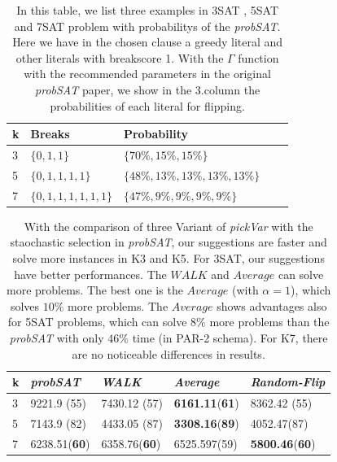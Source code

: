\documentclass[12pt,a4paper,twoside]{scrartcl}
\numberwithin{equation}{section}
\begin{document}
\begin{table}[h!]
\label{parma}
\begin{center}
\begin{tabular}{|l|l|l|l|p{3cm}|}\hline 
k&  Breaks &          Probability  \\ \hline     
3&  $\{0, 1, 1\}$ & $\{70\%, 15\%, 15\%\}$   \\ \hline         
5 &  $\{0, 1, 1, 1, 1\}$   & $\{  48\%, 13\%, 13\%, 13\%, 13\%\}$\\ \hline
7 & $\{0, 1, 1, 1, 1, 1, 1\}$&    $\{  47\%, 9\%, 9\%, 9\%, 9\%\}$\\ \hline
\end{tabular}
\caption{In this table, we list three examples in 3SAT , 5SAT and 7SAT problem with probabilitys of the \emph{probSAT}. Here we have in the chosen clause a greedy literal and other literals with breakscore 1.  With the  $\Gamma$  function with the recommended parameters in the original \emph{probSAT} paper, we show in the 3.column the probabilities of each literal for flipping.}
\end{center}
\end{table}  
\begin{table}[h!]
\begin{center}
    \begin{tabular}{|l|l|l|l|p{3cm}|}
\hline 
    k &\emph{probSAT}&\emph{WALK}&\emph{Average}&\emph{Random-Flip} \\ \hline
	3&9221.9 (55)&7430.12 (57)&\textbf{6161.11}(\textbf{61})&8362.42 (55) \\ \hline
	5&7143.9 (82)&4433.05 (87)&\textbf{3308.16}(\textbf{89})&4052.47(87)\\ \hline

	7& 	6238.51(\textbf{60})& 6358.76(\textbf{60})&6525.597(59)&\textbf{5800.46}(\textbf{60})\\ \hline
	
\end{tabular}
\caption{With the comparison of three Variant of \emph{pickVar}  with the staochastic selection in \emph{probSAT}, our suggestions are faster and solve more instances in K3 and K5. For 3SAT, our suggestions have better performances. The $WALK$ and $Average$ can solve more problems. The best one is the $Average$ (with $\alpha = 1$), which solves $10\%$ more problems. The $Average$ shows advantages also for 5SAT problems, which can solve $8\%$ more problems than the \emph{probSAT} with only $46\%$ time (in PAR-2 schema). For K7,  there are no noticeable differences in results.}
\end{center}
\end{table} 
\end{document}
